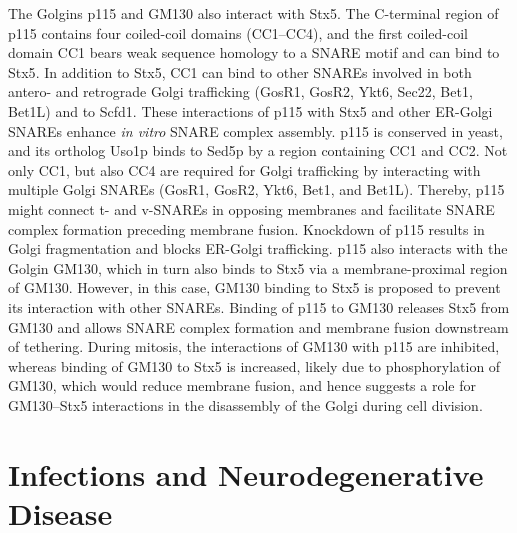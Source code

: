 The Golgins p115 and GM130 also interact with Stx5. The C-terminal region of p115 contains four coiled-coil domains (CC1–CC4), and the first coiled-coil domain CC1 bears weak sequence homology to a SNARE motif and can bind to Stx5\cite{shorter_sequential_2002}. In addition to Stx5, CC1 can bind to other SNAREs involved in both antero- and retrograde Golgi trafficking (GosR1, GosR2, Ykt6, Sec22, Bet1, Bet1L) and to Scfd1\cite{wang_p115snare_2015}. These interactions of p115 with Stx5 and other ER-Golgi SNAREs enhance \emph{in vitro} SNARE complex assembly\cite{shorter_sequential_2002}. p115 is conserved in yeast, and its ortholog Uso1p binds to Sed5p by a region containing CC1 and CC2\cite{yuan_rewiring_2017}. Not only CC1, but also CC4 are required for Golgi trafficking by interacting with multiple Golgi SNAREs (GosR1, GosR2, Ykt6, Bet1, and Bet1L)\cite{wang_p115snare_2015}. Thereby, p115 might connect t- and v-SNAREs in opposing membranes\cite{wang_p115snare_2015} and facilitate SNARE complex formation preceding membrane fusion\cite{puthenveedu_subcompartmentalizing_2005}. Knockdown of p115 results in Golgi fragmentation and blocks ER-Golgi trafficking\cite{puthenveedu_subcompartmentalizing_2005}. p115 also interacts with the Golgin GM130, which in turn also binds to Stx5\cite{nelson_membrane_1998} via a membrane-proximal region of GM130\cite{diao_coordination_2008}. However, in this case, GM130 binding to Stx5 is proposed to prevent its interaction with other SNAREs\cite{diao_coordination_2008}. Binding of p115 to GM130 releases Stx5 from GM130 and allows SNARE complex formation and membrane fusion downstream of tethering\cite{diao_coordination_2008}. During mitosis, the interactions of GM130 with p115 are inhibited, whereas binding of GM130 to Stx5 is increased, likely due to phosphorylation of GM130, which would reduce membrane fusion, and hence suggests a role for GM130–Stx5 interactions in the disassembly of the Golgi during cell division\cite{diao_coordination_2008}.

\section{Infections and Neurodegenerative Disease}


